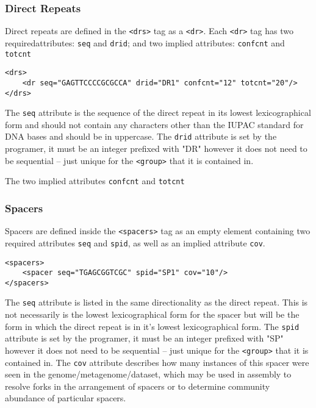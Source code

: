 \documentclass[11pt]{article} %
\begin{document}
\subsubsection{Direct Repeats}
Direct repeats are defined in the \lstinline[language=XML_new]$<drs>$  tag as a \lstinline[language=XML_new]$<dr>$.  Each \lstinline[language=XML_new]$<dr>$  tag has two requiredattributes: \lstinline[language=XML_new]$seq$ and \lstinline[language=XML_new]$drid$; and two implied attributes: \lstinline[language=XML_new]$confcnt$ and \lstinline[language=XML_new]$totcnt$

\begin{lstlisting}[language=XML_new]
<drs>
	<dr seq="GAGTTCCCCGCGCCA" drid="DR1" confcnt="12" totcnt="20"/>
</drs>
\end{lstlisting}

The \lstinline[language=XML_new]$seq$ attribute is the sequence of the direct repeat in its lowest lexicographical form and should not contain any characters other than the IUPAC standard for DNA bases and should be in uppercase.   The \lstinline[language=XML_new]$drid$ attribute is set by the programer, it must be an integer prefixed with "DR" however it does not need to be sequential -- just unique for the \lstinline[language=XML_new]$<group>$ that it is contained in.  

The two implied attributes \lstinline[language=XML_new]$confcnt$ and \lstinline[language=XML_new]$totcnt$

\subsubsection{Spacers}
Spacers are defined inside the \lstinline[language=XML_new]$<spacers>$ tag as an empty element containing two required attributes \lstinline[language=XML_new]$seq$ and \lstinline[language=XML_new]$spid$, as well as an implied attribute \lstinline[language=XML_new]$cov$.
\begin{lstlisting}[language=XML_new]
<spacers>
	<spacer seq="TGAGCGGTCGC" spid="SP1" cov="10"/>
</spacers>
\end{lstlisting}
The \lstinline[language=XML_new]$seq$ attribute is listed in the same directionality as the direct repeat.  This is not necessarily is the lowest lexicographical form for the spacer but will be the form in which the direct repeat is in it's lowest lexicographical form.  The \lstinline[language=XML_new]$spid$ attribute is set by the programer, it must be an integer prefixed with "SP" however it does not need to be sequential -- just unique for the \lstinline[language=XML_new]$<group>$ that it is contained in.  The \lstinline[language=XML_new]$cov$ attribute describes how many instances of this spacer were seen in the genome/metagenome/dataset, which may be used in assembly to resolve forks in the arrangement of spacers or to determine community abundance of particular spacers. 
\end{document}

